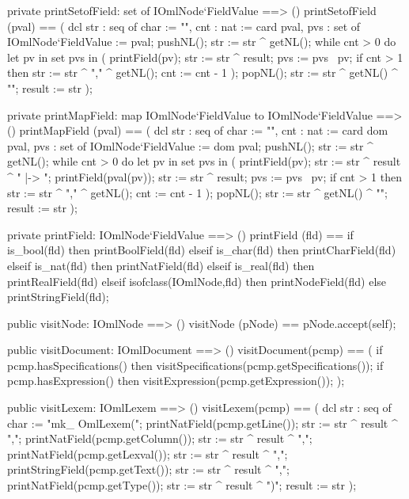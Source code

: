 \begin{vdm_al}
  private printSetofField: set of IOmlNode`FieldValue ==> ()
  printSetofField (pval) ==
    ( dcl str : seq of char := "{", cnt : nat := card pval,
          pvs : set of IOmlNode`FieldValue := pval;
      pushNL();
      str := str ^ getNL();
      while cnt > 0 do
        let pv in set pvs in
          ( printField(pv);
            str := str ^ result;
            pvs := pvs \ {pv};
            if cnt > 1
            then str := str ^ "," ^ getNL();
            cnt := cnt - 1 ); 
      popNL();
      str := str ^ getNL() ^ "}";
      result := str );

  private printMapField: map IOmlNode`FieldValue to IOmlNode`FieldValue ==> ()
  printMapField (pval) == 
    ( dcl str : seq of char := "{", cnt : nat := card dom pval,
          pvs : set of IOmlNode`FieldValue := dom pval;
      pushNL();
      str := str ^ getNL();
      while cnt > 0 do
        let pv in set pvs in
          ( printField(pv);
            str := str ^ result ^ " |-> ";
            printField(pval(pv));
            str := str ^ result;
            pvs := pvs \ {pv};
            if cnt > 1
            then str := str ^ "," ^ getNL();
            cnt := cnt - 1 ); 
      popNL();
      str := str ^ getNL() ^ "}";
      result := str );

  private printField: IOmlNode`FieldValue ==> ()
  printField (fld) ==
    if is_bool(fld) then printBoolField(fld)
    elseif is_char(fld) then printCharField(fld)
    elseif is_nat(fld) then printNatField(fld)
    elseif is_real(fld) then printRealField(fld)
    elseif isofclass(IOmlNode,fld) then printNodeField(fld)
    else printStringField(fld);

  public visitNode: IOmlNode ==> ()
  visitNode (pNode) == pNode.accept(self);

  public visitDocument: IOmlDocument ==> ()
  visitDocument(pcmp) ==
    ( 
      if pcmp.hasSpecifications() then visitSpecifications(pcmp.getSpecifications());
      if pcmp.hasExpression() then visitExpression(pcmp.getExpression());
    );

  public visitLexem: IOmlLexem ==> ()
  visitLexem(pcmp) ==
    ( dcl str : seq of char := "mk_ OmlLexem(";
      printNatField(pcmp.getLine());
      str := str ^ result ^ ",";
      printNatField(pcmp.getColumn());
      str := str ^ result ^ ",";
      printNatField(pcmp.getLexval());
      str := str ^ result ^ ",";
      printStringField(pcmp.getText());
      str := str ^ result ^ ",";
      printNatField(pcmp.getType());
      str := str ^ result ^ ")";
      result := str );


\end{vdm_al}
